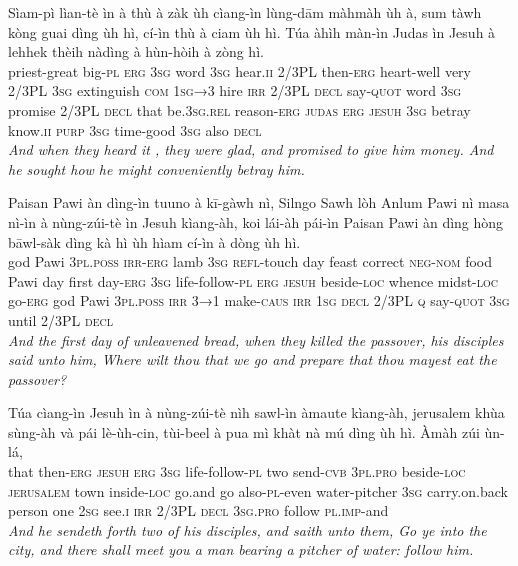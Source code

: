 \documentclass[11pt,a4paper]{article}
\begin{document}
\begin{exe}
\gll Sìam-pì lìan-tè ìn à thù à zàk ùh cìang-ìn lùng-dām màhmàh ùh à, sum tàwh kòng guai dìng ùh hì, cí-ìn thù à ciam ùh hì. Túa àhìh màn-ìn Judas ìn Jesuh à lehhek thèih nàdìng à hùn-hòih à zòng hì. \\
     priest-great big-\textsc{pl} \textsc{erg} \textsc{3sg} word \textsc{3sg} hear.\textsc{ii} 2/3PL then-\textsc{erg} heart-well very 2/3PL \textsc{3sg} extinguish \textsc{com} \textsc{1sg→3} hire \textsc{irr} 2/3PL \textsc{decl} say-\textsc{quot} word \textsc{3sg} promise 2/3PL \textsc{decl} that be.\textsc{3sg}.\textsc{rel} reason-\textsc{erg} \textsc{judas} \textsc{erg} \textsc{jesuh} \textsc{3sg} betray know.\textsc{ii} \textsc{purp} \textsc{3sg} time-good \textsc{3sg} also \textsc{decl} \\
\glt \textcolor{kjvcolor}{\textit{And when they heard it , they were glad, and promised to give him money. And he sought how he might conveniently betray him.}}

\gll Paisan Pawi àn dìng-ìn tuuno à kī-gàwh nì, Silngo Sawh lòh Anlum Pawi nì masa nì-ìn à nùng-zúi-tè ìn Jesuh kìang-àh, koi lái-àh pái-ìn Paisan Pawi àn dìng hòng bāwl-sàk dìng kà hì ùh hìam cí-ìn à dòng ùh hì. \\
     god Pawi \textsc{3pl}.\textsc{poss} \textsc{irr}-\textsc{erg} lamb \textsc{3sg} \textsc{refl}-touch day feast correct \textsc{neg}-\textsc{nom} food Pawi day first day-\textsc{erg} \textsc{3sg} life-follow-\textsc{pl} \textsc{erg} \textsc{jesuh} beside-\textsc{loc} whence midst-\textsc{loc} go-\textsc{erg} god Pawi \textsc{3pl}.\textsc{poss} \textsc{irr} \textsc{3→1} make-\textsc{caus} \textsc{irr} \textsc{1sg} \textsc{decl} 2/3PL \textsc{q} say-\textsc{quot} \textsc{3sg} until 2/3PL \textsc{decl} \\
\glt \textcolor{kjvcolor}{\textit{And the first day of unleavened bread, when they killed the passover, his disciples said unto him, Where wilt thou that we go and prepare that thou mayest eat the passover?}}

\gll Túa cìang-ìn Jesuh ìn à nùng-zúi-tè nìh sawl-ìn àmaute kìang-àh, jerusalem khùa sùng-àh và pái lè-ùh-cin, tùi-beel à pua mì khàt nà mú dìng ùh hì. Àmàh zúi ùn-lá, \\
     that then-\textsc{erg} \textsc{jesuh} \textsc{erg} \textsc{3sg} life-follow-\textsc{pl} two send-\textsc{cvb} \textsc{3pl}.\textsc{pro} beside-\textsc{loc} \textsc{jerusalem} town inside-\textsc{loc} go.and go also-\textsc{pl}-even water-pitcher \textsc{3sg} carry.on.back person one \textsc{2sg} see.\textsc{i} \textsc{irr} 2/3PL \textsc{decl} \textsc{3sg}.\textsc{pro} follow \textsc{pl}.\textsc{imp}-and \\
\glt \textcolor{kjvcolor}{\textit{And he sendeth forth two of his disciples, and saith unto them, Go ye into the city, and there shall meet you a man bearing a pitcher of water: follow him.}}


\end{exe}
\end{document}
